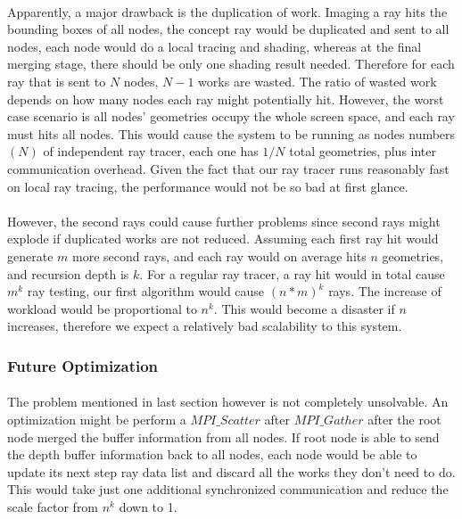\documentclass[a4paper, oneside, 10pt]{article}
\begin{document}
\paragraph{} Apparently, a major drawback is the duplication of work. Imaging a ray hits the bounding boxes of all nodes, the concept ray would be duplicated and sent to all nodes, each node would do a local tracing and shading, whereas at the final merging stage, there should be only one shading result needed. Therefore for each ray that is sent to $N$ nodes, $N-1$ works are wasted. The ratio of wasted work depends on how many nodes each ray might potentially hit. However, the worst case scenario is all nodes' geometries occupy the whole screen space, and each ray must hits all nodes. This would cause the system to be running as nodes numbers $(N)$ of independent ray tracer, each one has $1/N$ total geometries, plus inter communication overhead. Given the fact that our ray tracer runs reasonably fast on local ray tracing, the performance would not be so bad at first glance.
\paragraph{}However, the second rays could cause further problems since second rays might explode if duplicated works are not reduced. Assuming each first ray hit would generate $m$ more second rays, and each ray would on average hits $n$ geometries, and recursion depth is $k$. For a regular ray tracer, a ray hit would in total cause $m^k$ ray testing, our first algorithm would cause $(n*m)^k$ rays. The increase of workload would be proportional to $n^k$. This would become a disaster if $n$ increases, therefore we expect a relatively bad scalability to this system.
\subsubsection{Future Optimization}

\paragraph{}The problem mentioned in last section however is not completely unsolvable. An optimization might be perform a $MPI\_Scatter$ after $MPI\_Gather$ after the root node merged the buffer information from all nodes. If root node is able to send the depth buffer information back to all nodes, each node would be able to update its next step ray data list and discard all the works they don't need to do. This would take just one additional synchronized communication and reduce the scale factor from $n^k$ down to 1.
\end{document}
